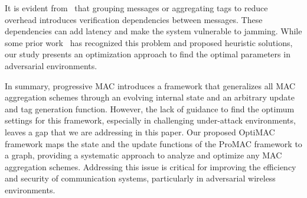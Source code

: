It is evident from~\cite{proMac2, DoS_AggregateMAC, when_And_How_Aggregate_In_Lossy_Channel} that grouping messages or aggregating tags to reduce overhead introduces verification dependencies between messages. These dependencies can add latency and make the system vulnerable to jamming. While some prior work~\cite{DoS_AggregateMAC, proMac2} has recognized this problem and proposed heuristic solutions, our study presents an optimization approach to find the optimal parameters in adversarial environments.

In summary, progressive MAC introduces a framework that generalizes all MAC aggregation schemes through an evolving internal state and an arbitrary update and tag generation function. However, the lack of guidance to find the optimum settings for this framework, especially in challenging under-attack environments, leaves a gap that we are addressing in this paper. Our proposed OptiMAC framework maps the state and the update functions of the ProMAC framework to a graph, providing a systematic approach to analyze and optimize any MAC aggregation schemes. Addressing this issue is critical for improving the efficiency and security of communication systems, particularly in adversarial wireless environments. 















